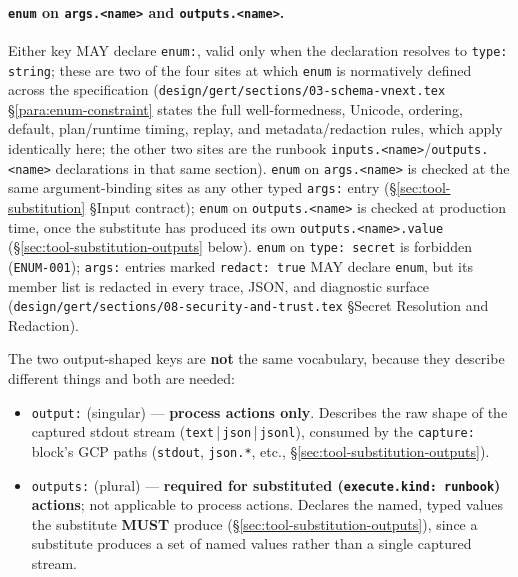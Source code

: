\paragraph{\texttt{enum} on \texttt{args.<name>} and \texttt{outputs.<name>}.}
Either key MAY declare \texttt{enum:}, valid only when the declaration
resolves to \texttt{type: string}; these are two of the four sites at which
\texttt{enum} is normatively defined across the specification
(\texttt{design/gert/sections/03-schema-vnext.tex} \S\ref{para:enum-constraint}
states the full well-formedness, Unicode, ordering, default, plan/runtime
timing, replay, and metadata/redaction rules, which apply identically here;
the other two sites are the runbook \texttt{inputs.<name>}/\texttt{outputs.<name>}
declarations in that same section). \texttt{enum} on \texttt{args.<name>} is
checked at the same argument-binding sites as any other typed
\texttt{args:} entry (\S\ref{sec:tool-substitution} \S Input contract);
\texttt{enum} on \texttt{outputs.<name>} is checked at production time, once
the substitute has produced its own \texttt{outputs.<name>.value}
(\S\ref{sec:tool-substitution-outputs} below). \texttt{enum} on
\texttt{type: secret} is forbidden (\texttt{ENUM-001}); \texttt{args:}
entries marked \texttt{redact: true} MAY declare \texttt{enum}, but its
member list is redacted in every trace, JSON, and diagnostic surface
(\texttt{design/gert/sections/08-security-and-trust.tex} \S Secret
Resolution and Redaction).

The two output-shaped keys are \textbf{not} the same vocabulary, because
they describe different things and both are needed:

\begin{itemize}
  \item \texttt{output:} (singular) --- \textbf{process actions only}.
        Describes the raw shape of the captured stdout stream
        (\texttt{text}\,|\,\texttt{json}\,|\,\texttt{jsonl}), consumed by the
        \texttt{capture:} block's GCP paths (\texttt{stdout},
        \texttt{json.*}, etc., \S\ref{sec:tool-substitution-outputs}).
  \item \texttt{outputs:} (plural) --- \textbf{required for substituted
        (\texttt{execute.kind: runbook}) actions}; not applicable to process
        actions. Declares the named, typed values the substitute
        \textbf{MUST} produce (\S\ref{sec:tool-substitution-outputs}), since
        a substitute produces a set of named values rather than a single
        captured stream.
\end{itemize}

